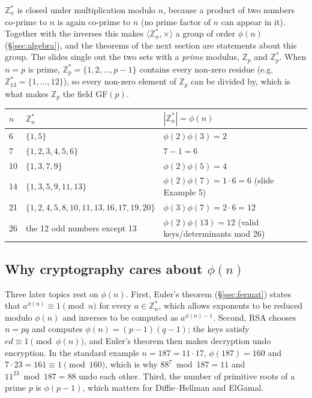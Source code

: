 $\mathbb{Z}_n^*$ is closed under multiplication modulo $n$, because a product of two numbers co-prime to $n$ is again co-prime to $n$ (no prime factor of $n$ can appear in it). Together with the inverses this makes $\langle \mathbb{Z}_n^*, \times \rangle$ a group of order $\phi(n)$ (\S\ref{sec:algebra}), and the theorems of the next section are statements about this group. The slides single out the two sets with a \emph{prime} modulus, $\mathbb{Z}_p$ and $\mathbb{Z}_p^*$. When $n = p$ is prime, $\mathbb{Z}_p^* = \{1, 2, \dots, p-1\}$ contains every non-zero residue (e.g.\ $\mathbb{Z}_{13}^* = \{1, \dots, 12\}$), so every non-zero element of $\mathbb{Z}_p$ can be divided by, which is what makes $\mathbb{Z}_p$ the field GF$(p)$.
\begin{center}\small
\begin{tabular}{@{}lll@{}}
\toprule
$n$ & $\mathbb{Z}_n^*$ & $|\mathbb{Z}_n^*| = \phi(n)$\\
\midrule
6 & $\{1, 5\}$ & $\phi(2)\phi(3) = 2$\\
7 & $\{1, 2, 3, 4, 5, 6\}$ & $7 - 1 = 6$\\
10 & $\{1, 3, 7, 9\}$ & $\phi(2)\phi(5) = 4$\\
14 & $\{1, 3, 5, 9, 11, 13\}$ & $\phi(2)\phi(7) = 1 \cdot 6 = 6$ \;(slide Example 5)\\
21 & $\{1, 2, 4, 5, 8, 10, 11, 13, 16, 17, 19, 20\}$ & $\phi(3)\phi(7) = 2 \cdot 6 = 12$\\
26 & the 12 odd numbers except 13 & $\phi(2)\phi(13) = 12$ \;(valid keys/determinants mod 26)\\
\bottomrule
\end{tabular}
\end{center}

\subsection{Why cryptography cares about \texorpdfstring{$\phi(n)$}{phi(n)}}
Three later topics rest on $\phi(n)$. First, Euler's theorem (\S\ref{sec:fermat}) states that $a^{\phi(n)} \equiv 1 \pmod n$ for every $a \in \mathbb{Z}_n^*$, which allows exponents to be reduced modulo $\phi(n)$ and inverses to be computed as $a^{\phi(n)-1}$. Second, RSA chooses $n = pq$ and computes $\phi(n) = (p-1)(q-1)$; the keys satisfy $ed \equiv 1 \pmod{\phi(n)}$, and Euler's theorem then makes decryption undo encryption. In the standard example $n = 187 = 11 \cdot 17$, $\phi(187) = 160$ and $7 \cdot 23 = 161 \equiv 1 \pmod{160}$, which is why $88^7 \bmod 187 = 11$ and $11^{23} \bmod 187 = 88$ undo each other. Third, the number of primitive roots of a prime $p$ is $\phi(p - 1)$, which matters for Diffie--Hellman and ElGamal.

